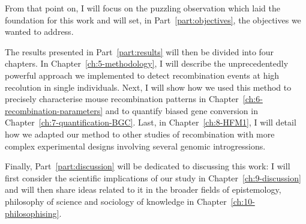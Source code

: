 From that point on, I will focus on the puzzling observation which laid the foundation for this work and will set, in Part~\ref{part:objectives}, the objectives we wanted to address.

The results presented in Part~\ref{part:results} will then be divided into four chapters.
In Chapter~\ref{ch:5-methodology}, I will describe the unprecedentedly powerful approach we implemented to detect recombination events at high recolution in single individuals.
Next, I will show how we used this method to precisely characterise mouse recombination patterns in Chapter~\ref{ch:6-recombination-parameters} and to quantify biased gene conversion in Chapter~\ref{ch:7-quantification-BGC}.
Last, in Chapter~\ref{ch:8-HFM1}, I will detail how we adapted our method to other studies of recombination with more complex experimental designs involving several genomic introgressions.

Finally, Part~\ref{part:discussion} will be dedicated to discussing this work: I will first consider the scientific implications of our study in Chapter~\ref{ch:9-discussion} and will then share ideas related to it in the broader fields of epistemology, philosophy of science and sociology of knowledge in Chapter~\ref{ch:10-philosophising}.










